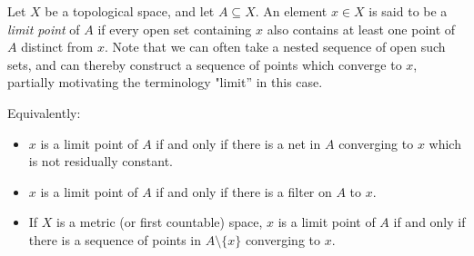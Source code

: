 \documentclass{article}
\begin{document}
Let $X$ be a topological space, and let $A\subseteq X$.  An element $x\in X$ is said to be a \emph{limit point} of $A$ if every open set containing $x$ also contains at least one point of $A$ distinct from $x$.  Note that we can often take a nested sequence of open such sets, and can thereby construct a sequence of points which converge to $x$, partially motivating the terminology "limit'' in this case.

Equivalently:
\begin{itemize}
\item $x$ is a limit point of $A$ if and only if there is a net in $A$ converging to $x$ which is not residually constant.
\item $x$ is a limit point of $A$ if and only if there is a filter on $A$  to $x$.
\item If $X$ is a metric (or first countable) space, $x$ is a limit point of $A$ if and only if there is a sequence of points in $A\setminus\{x\}$ converging to $x$.
\end{itemize}
\end{document}
